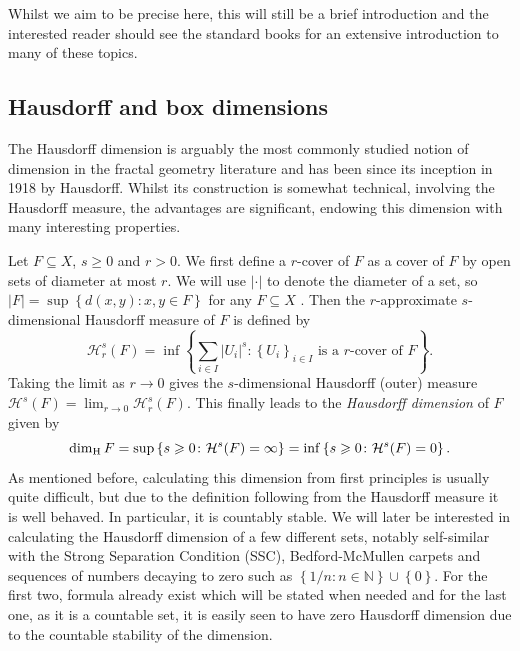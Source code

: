 Whilst we aim to be precise here, this will still be a brief introduction and the interested reader should see the standard books \cite{falconer, falconer2, mattila} for an extensive introduction to many of these topics. 



\subsection{Hausdorff and box dimensions}
\label{sec:intro-haus-box}

The Hausdorff dimension is arguably the most commonly studied notion of dimension in the fractal geometry literature and has been since its inception in 1918 by Hausdorff. Whilst its construction is somewhat technical, involving the Hausdorff measure, the advantages are significant, endowing this dimension with many interesting properties. 

Let $F\subseteq X$, $s\ge 0$ and $r > 0$. We first define a $r$-cover of $F$ as a cover of $F$ by open sets of diameter at most $r$. We will use $\lvert \cdot \rvert$ to denote the diameter of a set, so $\lvert F \rvert = \sup \left\{d(x,y) \colon x,y \in F \right\}$ for any $F\subseteq X$ . Then the $r$-approximate $s$-dimensional Hausdorff measure of $F$ is defined by 
\[
\mathcal{H}^s_r (F) = \inf\left\{ \sum_{i\in I} \lvert U_i \rvert^s \colon \left\{U_i \right\}_{i\in I} \text{ is a $r$-cover of }F  \right\}.
\]
Taking the limit as $r \rightarrow 0 $ gives the $s$-dimensional Hausdorff (outer) measure $\mathcal{H}^s(F) = \lim_{r\rightarrow 0} \mathcal{H}^s_r(F)$. This finally leads to the \textit{Hausdorff dimension} of $F$ given by
\[
\dim_{\text{H}} F = \sup\left\{s \geqslant 0 \colon \mathcal{H}^s(F) = \infty\right\} = \inf\left\{s\geqslant 0 \colon \mathcal{H}^s(F) = 0\right\}.
\]
As mentioned before, calculating this dimension from first principles is usually quite difficult, but due to the definition following from the Hausdorff measure it is well behaved. In particular, it is countably stable. We will later be interested in calculating the Hausdorff dimension of a few different sets, notably self-similar with the Strong Separation Condition (SSC), Bedford-McMullen carpets and sequences of numbers decaying to zero such as $\left\{1/n \colon n\in \mathbb{N}\right\}\cup \left\{ 0\right\}$. For the first two, formula already exist which will be stated when needed and for the last one, as it is a countable set, it is easily seen to have zero Hausdorff dimension due to the countable stability of the dimension.

